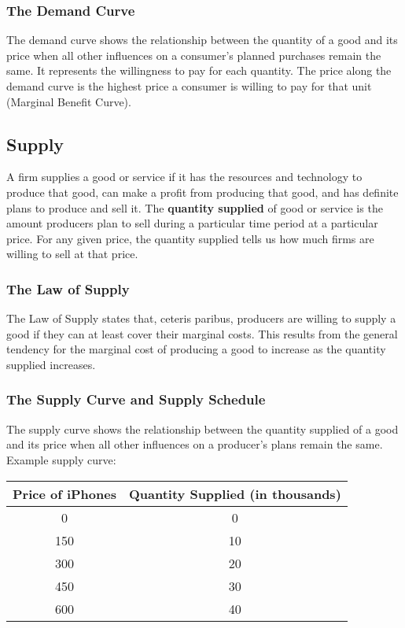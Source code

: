 \documentclass[letterpaper, 12pt]{article}
\begin{document}
\subsubsection{The Demand Curve}
The demand curve shows the relationship between the quantity of a good and
its price when all other influences on a consumer's planned purchases remain
the same. It represents the willingness to pay for each quantity. The price
along the demand curve is the highest price a consumer is willing to pay
for that unit (Marginal Benefit Curve).

\subsection{Supply}
A firm supplies a good or service if it has the resources and technology to
produce that good, can make a profit from producing that good, and has
definite plans to produce and sell it. The \textbf{quantity supplied} of good
or service is the amount producers plan to sell during a particular time
period at a particular price. For any given price, the quantity supplied
tells us how much firms are willing to sell at that price.

\subsubsection{The Law of Supply}
The Law of Supply states that, ceteris paribus, producers are willing to supply
a good if they can at least cover their marginal costs. This results from the
general tendency for the marginal cost of producing a good to increase as the
quantity supplied increases.

\subsubsection{The Supply Curve and Supply Schedule}
The supply curve shows the relationship between the quantity supplied of a good
and its price when all other influences on a producer's plans remain the same.
Example supply curve:
\begin{center}
  \begin{tabular}{|c|c|}
    \hline
    Price of iPhones & Quantity Supplied (in thousands) \\ \hline
    0   & 0  \\ \hline
    150 & 10 \\ \hline
    300 & 20 \\ \hline
    450 & 30 \\ \hline
    600 & 40 \\ \hline
  \end{tabular}
\end{center}
\end{document}
